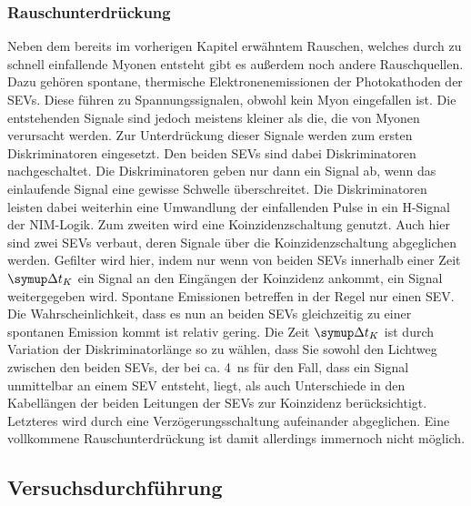 \documentclass[
  bibliography=totoc,     %
  captions=tableheading,  %
  titlepage=firstiscover, %
]{scrartcl}
\begin{document}
  \subsubsection{Rauschunterdrückung}
  \label{Rausch}
  Neben dem bereits im vorherigen Kapitel erwähntem Rauschen, welches durch zu
  schnell einfallende Myonen entsteht gibt es außerdem noch andere Rauschquellen.
  Dazu gehören spontane, thermische Elektronenemissionen der Photokathoden
  der SEVs. Diese führen zu Spannungssignalen, obwohl kein Myon eingefallen ist.
  Die entstehenden Signale sind jedoch meistens kleiner als die, die von Myonen verursacht werden.
  Zur Unterdrückung dieser Signale werden zum ersten Diskriminatoren eingesetzt.
  Den beiden SEVs sind dabei Diskriminatoren nachgeschaltet. Die Diskriminatoren geben nur dann ein Signal
  ab, wenn das einlaufende Signal eine gewisse Schwelle überschreitet. Die
  Diskriminatoren leisten dabei weiterhin eine Umwandlung der einfallenden Pulse
  in ein H-Signal der NIM-Logik.
  Zum zweiten wird eine Koinzidenzschaltung genutzt. Auch hier sind zwei SEVs
  verbaut, deren Signale über die Koinzidenzschaltung
  abgeglichen werden. Gefilter wird hier, indem nur wenn von beiden SEVs innerhalb einer Zeit $\symup\Delta t_K$
  ein Signal an den Eingängen der Koinzidenz ankommt, ein Signal weitergegeben wird.
  Spontane Emissionen betreffen in der Regel nur einen SEV. Die Wahrscheinlichkeit,
  dass es nun an beiden SEVs gleichzeitig zu einer spontanen Emission kommt ist relativ gering.
  Die Zeit $\symup\Delta t_K$
  ist durch Variation der Diskriminatorlänge so zu wählen, dass Sie sowohl den Lichtweg zwischen den beiden SEVs,
  der bei ca. \SI{4}{\nano\second} für den Fall, dass ein Signal unmittelbar an einem SEV
  entsteht, liegt, als auch Unterschiede in den Kabellängen der beiden Leitungen der
  SEVs zur Koinzidenz berücksichtigt. Letzteres wird durch eine Verzögerungsschaltung
  aufeinander abgeglichen.
  Eine vollkommene Rauschunterdrückung ist damit allerdings immernoch nicht
  möglich.
  \subsection{Versuchsdurchführung}
  \label{sec:Durchführung}
\end{document}
